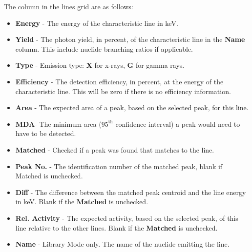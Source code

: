 \documentclass[12pt,report,justified]{SANDreport}
\begin{document}
The column in the lines grid are as follows:
\begin{itemize}
    \item \textbf{Energy} - The energy of the characteristic line in keV.
    \item \textbf{Yield} - The photon yield, in percent, of the characteristic line in the \textbf{Name} column. This include nuclide branching ratios if applicable.
    \item \textbf{Type} - Emission type: \textbf{X} for x-rays, \textbf{G} for gamma rays.
    \item \textbf{Efficiency} - The detection efficiency, in percent, at the energy of the characteristic line. This will be zero if there is no efficiency information.
    \item \textbf{Area} - The expected area of a peak, based on the selected peak, for this line.
    \item \textbf{MDA}- The minimum area (\(95^{\text{th}}\) confidence interval) a peak would need to have to be detected.
    \item \textbf{Matched} - Checked if a peak was found that matches to the line.
    \item \textbf{Peak No.} - The identification number of the matched peak, blank if Matched is unchecked.
    \item \textbf{Diff} - The difference between the matched peak centroid and the line energy in keV. Blank if the \textbf{Matched} is unchecked.
    \item \textbf{Rel. Activity} - The expected activity, based on the selected peak, of this line relative to the other lines. Blank if the \textbf{Matched} is unchecked.
    \item \textbf{Name} - Library Mode only. The name of the nuclide emitting the line.
\end{itemize}
\end{document}
